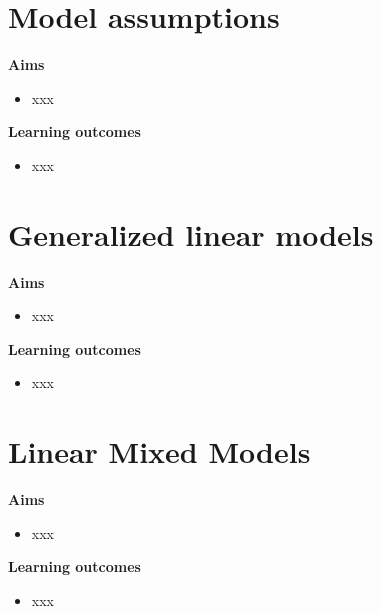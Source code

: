 \documentclass[
]{book}
\providecommand{\tightlist}{%
  \setlength{\itemsep}{0pt}\setlength{\parskip}{0pt}}
\theoremstyle{definition}
\theoremstyle{definition}
\theoremstyle{definition}
\theoremstyle{remark}
\begin{document}
\hypertarget{model-assumptions}{%
\chapter{Model assumptions}\label{model-assumptions}}

\textbf{Aims}

\begin{itemize}
\tightlist
\item
  xxx
\end{itemize}

\textbf{Learning outcomes}

\begin{itemize}
\tightlist
\item
  xxx
\end{itemize}

\hypertarget{generalized-linear-models}{%
\chapter{Generalized linear models}\label{generalized-linear-models}}

\textbf{Aims}

\begin{itemize}
\tightlist
\item
  xxx
\end{itemize}

\textbf{Learning outcomes}

\begin{itemize}
\tightlist
\item
  xxx
\end{itemize}

\hypertarget{linear-mixed-models}{%
\chapter{Linear Mixed Models}\label{linear-mixed-models}}

\textbf{Aims}

\begin{itemize}
\tightlist
\item
  xxx
\end{itemize}

\textbf{Learning outcomes}

\begin{itemize}
\tightlist
\item
  xxx
\end{itemize}
\end{document}
